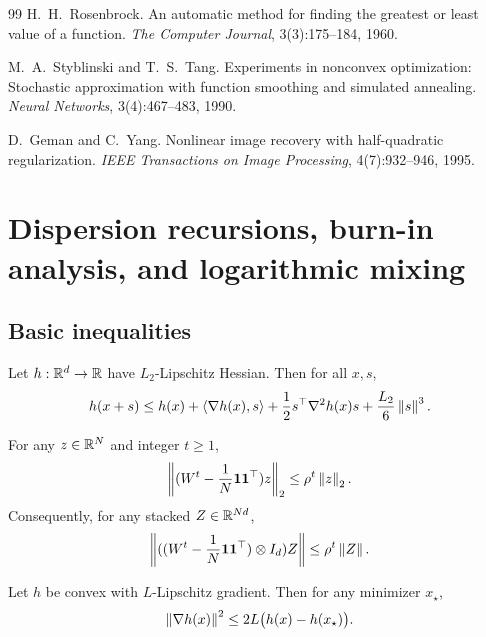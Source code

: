 \documentclass[review,onefignum,onetabnum]{siamart171218}
\begin{document}
\begin{thebibliography}{99}
		H.~H.~Rosenbrock.
		\newblock An automatic method for finding the greatest or least value of a function.
		\newblock \textit{The Computer Journal}, 3(3):175--184, 1960.
		
		M.~A.~Styblinski and T.~S.~Tang.
		\newblock Experiments in nonconvex optimization: Stochastic approximation with function smoothing and simulated annealing.
		\newblock \textit{Neural Networks}, 3(4):467--483, 1990.
		
		D.~Geman and C.~Yang.
		\newblock Nonlinear image recovery with half-quadratic regularization.
		\newblock \textit{IEEE Transactions on Image Processing}, 4(7):932--946, 1995.
		
	\end{thebibliography}
	
	\appendix
	
	\section{Dispersion recursions, burn-in analysis, and logarithmic mixing}\label{app:dispersion}
	
	\subsection{Basic inequalities}\label{ssec:basic}
	\begin{lemma}\label{lem:taylor3}
		Let $h:\mathbb{R}^d\to\mathbb{R}$ have $L_2$-Lipschitz Hessian. Then for all $x,s$,
		\[
		h(x+s)\le h(x)+\left\langle \nabla h(x),s\right\rangle+\frac12 s^\top\nabla^2 h(x)s+\frac{L_2}{6}\left\|s\right\|^3.
		\]
	\end{lemma}
	
	\begin{lemma}\label{lem:consensus}
		For any $z\in\mathbb{R}^N$ and integer $t\ge 1$,
		\[
		\left\|(W^t-\frac{1}{N}\mathbf{1}\mathbf{1}^\top)z\right\|_2\le \rho^t\left\|z\right\|_2.
		\]
		Consequently, for any stacked $Z\in\mathbb{R}^{Nd}$,
		\[
		\left\|((W^t-\frac{1}{N}\mathbf{1}\mathbf{1}^\top)\otimes I_d)Z\right\|\le \rho^t\left\|Z\right\|.
		\]
	\end{lemma}
	
	\begin{lemma}\label{lem:gap-grad}
		Let $h$ be convex with $L$-Lipschitz gradient. Then for any minimizer $x_\star$,
		\[
		\left\|\nabla h(x)\right\|^2\le 2L\big(h(x)-h(x_\star)\big).
		\]
	\end{lemma}
	
\end{document}

